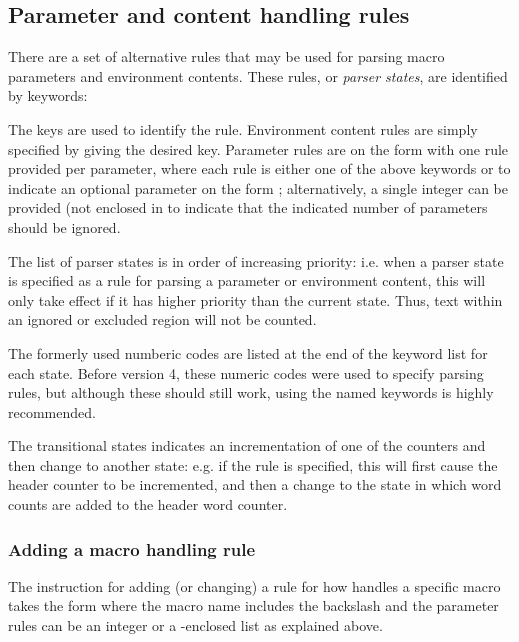 \documentclass{article}
\begin{document}



\subsection{Parameter and content handling rules}\label{subsec:TC_addrule}

There are a set of alternative rules that may be used for parsing macro parameters and environment contents. These rules, or \emph{parser states}, are identified by keywords:
%


The keys are used to identify the rule. Environment content rules are simply specified by giving the desired key. Parameter rules are on the form  with one rule provided per parameter, where each rule is either one of the above keywords or  to indicate an optional parameter on the form \code{[\ldots]}; alternatively, a single integer can be provided (not enclosed in \code{[]} to indicate that the indicated number of parameters should be ignored.

The list of parser states is in order of increasing priority: i.e. when a parser state is specified as a rule for parsing a parameter or environment content, this will only take effect if it has higher priority than the current state. Thus, text within an ignored or excluded region will not be counted.

The formerly used numberic codes are listed at the end of the keyword list for each state. Before version 4, these numeric codes were used to specify parsing rules, but although these should still work, using the named keywords is highly recommended.

The transitional states indicates an incrementation of one of the counters and then change to another state: e.g. if the  rule is specified, this will first cause the header counter to be incremented, and then a change to the  state in which word counts are added to the header word counter. 

\subsubsection{Adding a macro handling rule}

The \TeXcount{} instruction for adding (or changing) a rule for how \TeXcount{} handles a specific macro takes the form
where the macro name includes the backslash and the parameter rules can be an integer or a \code{[]}-enclosed list as explained above.
\end{document}
